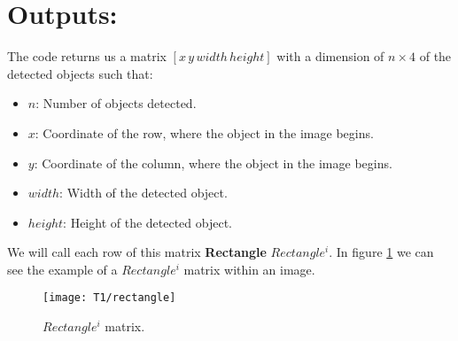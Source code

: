 \section{Outputs:}
The code returns us a matrix $[x\, y\, width\, height]$ with a dimension of $n\times 4$ of the detected objects such that:
\begin{itemize}
	\item $n$: Number of objects detected.
	\item $x$: Coordinate of the row, where the object in the image begins.
	\item $y$: Coordinate of the column, where the object in the image begins. %
	\item $width$: Width of the detected object.
	\item $height$: Height of the detected object.
\end{itemize}
We will call each row of this matrix \textbf{Rectangle} $Rectangle^{i}$. In figure \ref{fig:rect} we can see the example of a $Rectangle^{i}$ matrix within an image.
\begin{figure}[h!]
	\centering
	\texttt{[image: T1/rectangle]}
	\caption{$Rectangle^{i}$ matrix.}
	\label{fig:rect}
\end{figure}
